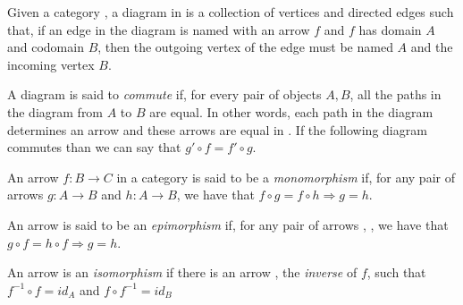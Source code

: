 \begin{definition}[Diagram] Given a category , a diagram in  is a collection of vertices and directed edges such that, if an edge in the diagram is named with an arrow $f$ and $f$ has domain $A$ and codomain $B$, then the outgoing vertex of the edge must be named $A$ and the incoming vertex $B$.

  A diagram is said to \emph{commute} if, for every pair of objects $A,B$, all the paths in the diagram from $A$ to $B$ are equal. In other words, each path in the diagram determines an arrow and these arrows are equal in . If the following diagram commutes than we can say that \mbox{$g' \circ f = f' \circ g$}.


\end{definition}

\begin{definition} An arrow \mbox{$f : B \rightarrow C$} in a category  is said to be a \emph{monomorphism} if, for any pair of arrows $g : A \rightarrow B$ and $h : A \rightarrow B$, we have that $f \circ g = f \circ h \Rightarrow g = h$.


  An arrow  is said to be an \emph{epimorphism} if, for any pair of arrows , , we have that \mbox{$g \circ f = h \circ f \Rightarrow g = h$}.


  An arrow  is an \emph{isomorphism} if there is an arrow , the \emph{inverse} of $f$, such that \mbox{$f^{-1} \circ f = id_A$} and \mbox{$f \circ f^{-1} = id_B$}


\end{definition}

